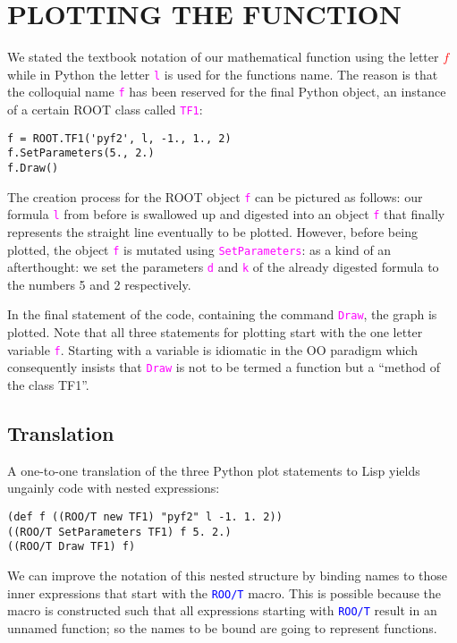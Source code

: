 \documentclass[twocolumn]{article}
\begin{document}
\section{PLOTTING THE FUNCTION}
We stated the textbook notation of our mathematical function using the letter \textcolor{red}{$f$} while in Python the letter \texttt{\textcolor{magenta}{l}} is used for the functions name. The reason is that the colloquial name \texttt{\textcolor{magenta}{f}} has been reserved for the final Python object, an instance of a certain ROOT class called \texttt{\textcolor{magenta}{TF1}}:
{\color{magenta}\begin{verbatim}
f = ROOT.TF1('pyf2', l, -1., 1., 2)
f.SetParameters(5., 2.)
f.Draw()
\end{verbatim}}
The creation process for the ROOT object \texttt{\textcolor{magenta}{f}} can be pictured as follows: our formula \texttt{\textcolor{magenta}{l}} from before is
swallowed up and digested into an object \texttt{\textcolor{magenta}{f}} that finally represents the straight line eventually to be plotted. However, before being plotted, the object \texttt{\textcolor{magenta}{f}} is mutated using \texttt{\textcolor{magenta}{SetParameters}}: as a kind of an afterthought: we set the parameters \texttt{\textcolor{magenta}{d}} and \texttt{\textcolor{magenta}{k}} of the already digested formula to the numbers 5 and 2 respectively.

In the final statement of the code, containing the command \texttt{\textcolor{magenta}{Draw}}, the graph is plotted. Note that all three statements for plotting start with the one letter variable \texttt{\textcolor{magenta}{f}}. Starting with a variable is idiomatic in the OO paradigm which consequently insists that \texttt{\textcolor{magenta}{Draw}} is not to be termed a function but a “method of the class TF1”.

\subsection{Translation}
A one-to-one translation of the three Python plot statements to Lisp yields ungainly code with nested expressions:
{\color{blue}\begin{verbatim}
(def f ((ROO/T new TF1) "pyf2" l -1. 1. 2))
((ROO/T SetParameters TF1) f 5. 2.)
((ROO/T Draw TF1) f)
\end{verbatim}}
We can improve the notation of this nested structure by binding names to those inner expressions that start with the \texttt{\textcolor{blue}{ROO/T}} macro. This is possible because the macro is constructed such that all expressions starting with \texttt{\textcolor{blue}{ROO/T}} result in an unnamed function; so the names to be bound are going to represent functions.
\end{document}
